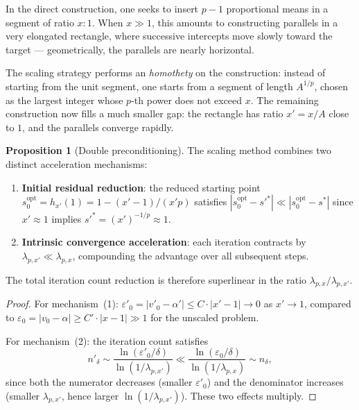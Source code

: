 \documentclass[11pt,a4paper]{article}
\theoremstyle{definition}
\newtheorem{proposition}{Proposition}[section]
\newcommand{\eps}{\varepsilon}
\begin{document}
\medskip

In the direct construction, one seeks to insert $p-1$ proportional means in a segment of ratio $x : 1$. When $x \gg 1$, this amounts to constructing parallels in a very elongated rectangle, where successive intercepts move slowly toward the target --- geometrically, the parallels are nearly horizontal.

\smallskip

The scaling strategy performs an \emph{homothety} on the construction: instead of starting from the unit segment, one starts from a segment of length $A^{1/p}$, chosen as the largest integer whose $p$-th power does not exceed $x$. The remaining construction now fills a much smaller gap: the rectangle has ratio $x' = x/A$ close to $1$, and the parallels converge rapidly.

\begin{proposition}[Double preconditioning]
\label{prop:preconditioning}
The scaling method combines two distinct acceleration mechanisms:
\begin{enumerate}
  \item \textbf{Initial residual reduction}: the reduced starting point $s_0^{\mathrm{opt}} = h_{x'}(1) = 1 - (x'-1)/(x'p)$ satisfies $|s_0^{\mathrm{opt}} - s'^*| \ll |s_0^{\mathrm{opt}} - s^*|$ since $x' \approx 1$ implies $s'^* = (x')^{-1/p} \approx 1$.
  \item \textbf{Intrinsic convergence acceleration}: each iteration contracts by $\lambda_{p,x'} \ll \lambda_{p,x}$, compounding the advantage over all subsequent steps.
\end{enumerate}
The total iteration count reduction is therefore superlinear in the ratio $\lambda_{p,x}/\lambda_{p,x'}$.
\end{proposition}

\begin{proof}
For mechanism~(1): $\eps'_0 = |v'_0 - \alpha'| \leq C \cdot |x' - 1| \to 0$ as $x' \to 1$, compared to $\eps_0 = |v_0 - \alpha| \geq C' \cdot |x - 1| \gg 1$ for the unscaled problem.

For mechanism~(2): the iteration count satisfies
\[
  n'_\delta \sim \frac{\ln(\eps'_0/\delta)}{\ln(1/\lambda_{p,x'})} \ll \frac{\ln(\eps_0/\delta)}{\ln(1/\lambda_{p,x})} \sim n_\delta,
\]
since both the numerator decreases (smaller $\eps'_0$) and the denominator increases (smaller $\lambda_{p,x'}$, hence larger $\ln(1/\lambda_{p,x'})$). These two effects multiply.
\end{proof}
\end{document}
